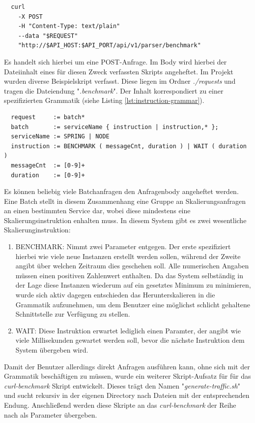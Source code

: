 \begin{verbatim}
  curl 
    -X POST 
    -H "Content-Type: text/plain" 
    --data "$REQUEST" 
    "http://$API_HOST:$API_PORT/api/v1/parser/benchmark"
\end{verbatim}

Es handelt sich hierbei um eine POST-Anfrage. Im Body wird hierbei der Dateiinhalt eines für diesen Zweck verfassten Skripts angeheftet. Im Projekt wurden diverse Beispielskript verfasst. Diese liegen im Ordner \emph{./requests} und tragen die Dateiendung "\emph{.benchmark}". Der Inhalt korrespondiert zu einer spezifizierten Grammatik (siehe Listing \ref{lst:instruction-grammar}). 

\label{lst:instruction-grammar}
\begin{verbatim}
  request     := batch*
  batch       := serviceName { instruction | instruction,* };
  serviceName := SPRING | NODE
  instruction := BENCHMARK ( messageCnt, duration ) | WAIT ( duration )
  messageCnt  := [0-9]+
  duration    := [0-9]+
\end{verbatim}

Es können beliebig viele Batchanfragen den Anfragenbody angeheftet werden. Eine Batch stellt in diesem Zusammenhang eine Gruppe an Skalierungsanfragen an einen bestimmten Service dar, wobei diese mindestens eine Skalierungsinstruktion enhalten muss. In diesem System gibt es zwei wesentliche Skalierunginstruktion: 

\begin{enumerate}
  \item BENCHMARK: Nimmt zwei Parameter entgegen. Der erste spezifiziert hierbei wie viele neue Instanzen erstellt werden sollen, während der Zweite angibt über welchen Zeitraum dies geschehen soll. Alle numerischen Angaben müssen einen positiven Zahlenwert enthalten. Da das System selbständig in der Lage diese Instanzen wiederum auf ein gesetztes Minimum zu minimieren, wurde sich aktiv dagegen entschieden das Herunterskalieren in die Grammatik aufzunehmen, um dem Benutzer eine möglichst schlicht gehaltene Schnittstelle zur Verfügung zu stellen.
  \item WAIT: Diese Instruktion erwartet lediglich einen Paramter, der angibt wie viele Millisekunden gewartet werden soll, bevor die nächste Instruktion dem System übergeben wird. 
\end{enumerate}


Damit der Benutzer allerdings direkt Anfragen ausführen kann, ohne sich mit der Grammatik beschäftigen zu müssen, wurde ein weiterer Skript-Aufsatz für 
für das \emph{curl-benchmark} Skript entwickelt. Dieses trägt den Namen "\emph{generate-traffic.sh}" und sucht rekursiv in der eigenen Directory nach Dateien mit der entsprechenden Endung. Anschließend werden diese Skripte an das \emph{curl-benchmark} der Reihe nach als Parameter übergeben.


